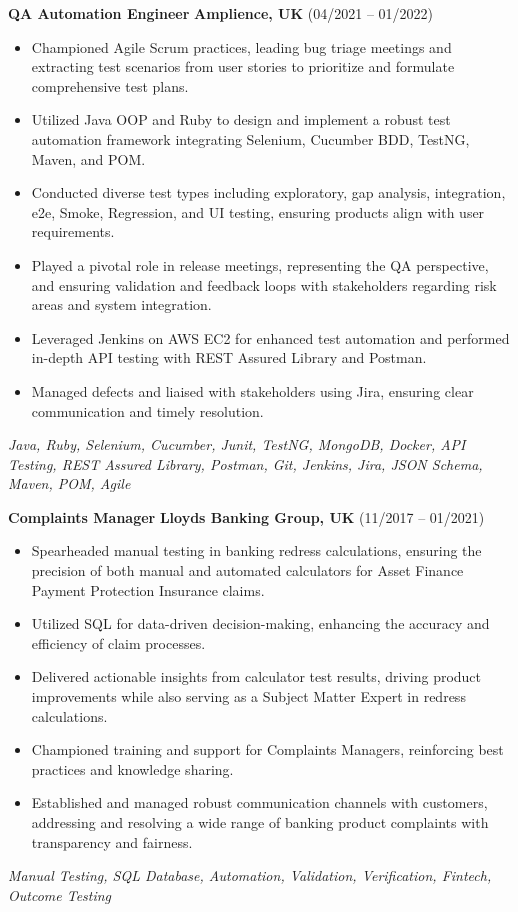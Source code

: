 \documentclass[11pt,a4paper]{article}
\begin{document}
    \noindent \textbf{QA Automation Engineer} \hfill \textbf{Amplience, UK} (04/2021 – 01/2022) \\
    \begin{itemize}
        \item Championed Agile Scrum practices, leading bug triage meetings and extracting test scenarios from user stories to prioritize and formulate comprehensive test plans.
        \item Utilized Java OOP and Ruby to design and implement a robust test automation framework integrating Selenium, Cucumber BDD, TestNG, Maven, and POM.
        \item Conducted diverse test types including exploratory, gap analysis, integration, e2e, Smoke, Regression, and UI testing, ensuring products align with user requirements.
        \item Played a pivotal role in release meetings, representing the QA perspective, and ensuring validation and feedback loops with stakeholders regarding risk areas and system integration.
        \item Leveraged Jenkins on AWS EC2 for enhanced test automation and performed in-depth API testing with REST Assured Library and Postman.
        \item Managed defects and liaised with stakeholders using Jira, ensuring clear communication and timely resolution.
    \end{itemize}
    \small \textit{Java, Ruby, Selenium, Cucumber, Junit, TestNG, MongoDB, Docker, API Testing, REST Assured Library, Postman, Git, Jenkins, Jira, JSON Schema, Maven, POM, Agile}


    \noindent \textbf{Complaints Manager} \hfill \textbf{Lloyds Banking Group, UK} (11/2017 – 01/2021) \\
    \begin{itemize}
        \item Spearheaded manual testing in banking redress calculations, ensuring the precision of both manual and automated calculators for Asset Finance Payment Protection Insurance claims.
        \item Utilized SQL for data-driven decision-making, enhancing the accuracy and efficiency of claim processes.
        \item Delivered actionable insights from calculator test results, driving product improvements while also serving as a Subject Matter Expert in redress calculations.
        \item Championed training and support for Complaints Managers, reinforcing best practices and knowledge sharing.
        \item Established and managed robust communication channels with customers, addressing and resolving a wide range of banking product complaints with transparency and fairness.
    \end{itemize}
    \small \textit{Manual Testing, SQL Database, Automation, Validation, Verification, Fintech, Outcome Testing}
\end{document}
